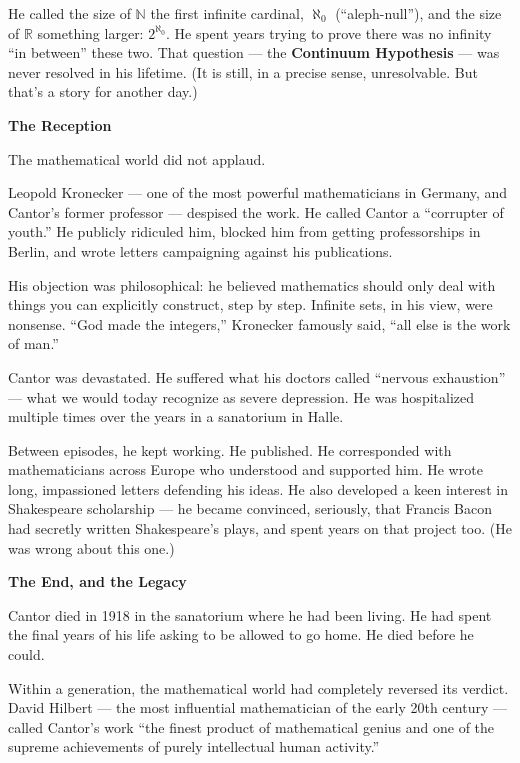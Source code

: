 \documentclass[12pt]{article}
\begin{document}
He called the size of $\mathbb{N}$ the first infinite cardinal, $\aleph_0$
(``aleph-null''), and the size of $\mathbb{R}$ something larger: $2^{\aleph_0}$.
He spent years trying to prove there was no infinity ``in between'' these two.
That question --- the \textbf{Continuum Hypothesis} --- was never resolved in his lifetime.
(It is still, in a precise sense, unresolvable. But that's a story for another day.)

\bigskip
\noindent\textbf{The Reception}

The mathematical world did not applaud.

Leopold Kronecker --- one of the most powerful mathematicians in Germany,
and Cantor's former professor --- despised the work. He called Cantor a
``corrupter of youth.'' He publicly ridiculed him, blocked him from getting
professorships in Berlin, and wrote letters campaigning against his publications.

His objection was philosophical: he believed mathematics should only deal with
things you can explicitly construct, step by step. Infinite sets, in his view,
were nonsense. ``God made the integers,'' Kronecker famously said,
``all else is the work of man.''

Cantor was devastated. He suffered what his doctors called ``nervous exhaustion''
--- what we would today recognize as severe depression. He was hospitalized multiple
times over the years in a sanatorium in Halle.

Between episodes, he kept working. He published. He corresponded with mathematicians
across Europe who understood and supported him. He wrote long, impassioned letters
defending his ideas. He also developed a keen interest in Shakespeare scholarship
--- he became convinced, seriously, that Francis Bacon had secretly written
Shakespeare's plays, and spent years on that project too. (He was wrong about this one.)

\bigskip
\noindent\textbf{The End, and the Legacy}

Cantor died in 1918 in the sanatorium where he had been living.
He had spent the final years of his life asking to be allowed to go home.
He died before he could.

Within a generation, the mathematical world had completely reversed its verdict.
David Hilbert --- the most influential mathematician of the early 20th century ---
called Cantor's work ``the finest product of mathematical genius and one of the
supreme achievements of purely intellectual human activity.''
\end{document}
